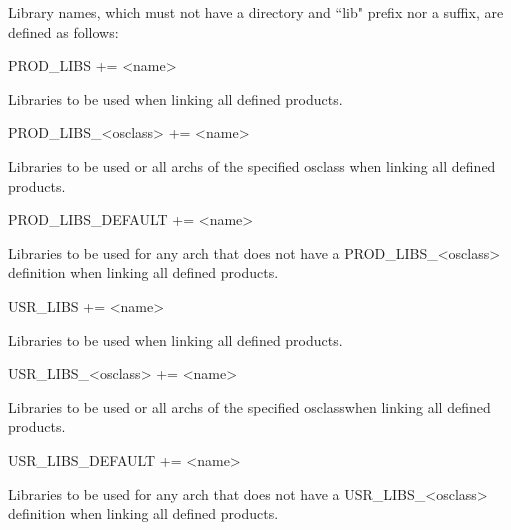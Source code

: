 Library names, which must not have a directory and ``lib" prefix nor a suffix, are defined as follows:

\begin{description}\item {}PROD\_LIBS += \textless{}name\textgreater{}

\end{description}Libraries to be used when linking all defined products.

\begin{description}\item PROD\_LIBS\_\textless{}osclass\textgreater{} += \textless{}name\textgreater{}

\end{description}Libraries to be used or all archs of the specified osclass when linking all defined products.

\begin{description}\item PROD\_LIBS\_DEFAULT += \textless{}name\textgreater{}

\end{description}Libraries to be used for any arch that does not have a PROD\_LIBS\_\textless{}osclass\textgreater{} definition when linking all 
defined products.



\begin{description}\item {}USR\_LIBS += \textless{}name\textgreater{}

\end{description}Libraries to be used when linking all defined products.

\begin{description}\item USR\_LIBS\_\textless{}osclass\textgreater{} += \textless{}name\textgreater{}

\end{description}Libraries to be used or all archs of the specified osclasswhen linking all defined products.

\begin{description}\item USR\_LIBS\_DEFAULT += \textless{}name\textgreater{}

\end{description}Libraries to be used for any arch that does not have a USR\_LIBS\_\textless{}osclass\textgreater{} definition when linking all 
defined products.



